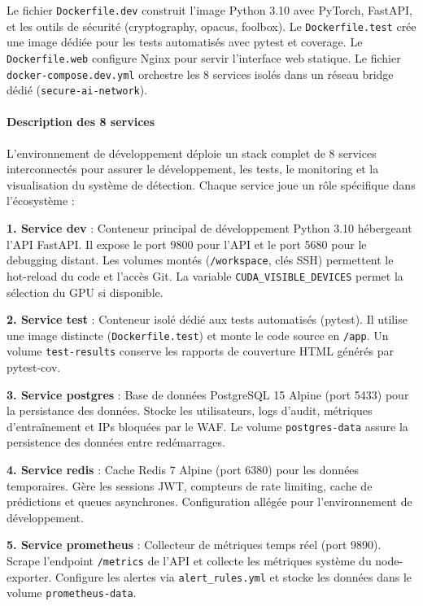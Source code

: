Le fichier \texttt{Dockerfile.dev} construit l'image Python 3.10 avec PyTorch, FastAPI, et les outils de sécurité (cryptography, opacus, foolbox). Le \texttt{Dockerfile.test} crée une image dédiée pour les tests automatisés avec pytest et coverage. Le \texttt{Dockerfile.web} configure Nginx pour servir l'interface web statique. Le fichier \texttt{docker-compose.dev.yml} orchestre les 8 services isolés dans un réseau bridge dédié (\texttt{secure-ai-network}).

\paragraph{Description des 8 services}

L'environnement de développement déploie un stack complet de 8 services interconnectés pour assurer le développement, les tests, le monitoring et la visualisation du système de détection. Chaque service joue un rôle spécifique dans l'écosystème :

\textbf{1. Service dev} : Conteneur principal de développement Python 3.10 hébergeant l'API FastAPI. Il expose le port 9800 pour l'API et le port 5680 pour le debugging distant. Les volumes montés (\texttt{/workspace}, clés SSH) permettent le hot-reload du code et l'accès Git. La variable \texttt{CUDA\_VISIBLE\_DEVICES} permet la sélection du GPU si disponible.

\textbf{2. Service test} : Conteneur isolé dédié aux tests automatisés (pytest). Il utilise une image distincte (\texttt{Dockerfile.test}) et monte le code source en \texttt{/app}. Un volume \texttt{test-results} conserve les rapports de couverture HTML générés par pytest-cov.

\textbf{3. Service postgres} : Base de données PostgreSQL 15 Alpine (port 5433) pour la persistance des données. Stocke les utilisateurs, logs d'audit, métriques d'entraînement et IPs bloquées par le WAF. Le volume \texttt{postgres-data} assure la persistence des données entre redémarrages.

\textbf{4. Service redis} : Cache Redis 7 Alpine (port 6380) pour les données temporaires. Gère les sessions JWT, compteurs de rate limiting, cache de prédictions et queues asynchrones. Configuration allégée pour l'environnement de développement.

\textbf{5. Service prometheus} : Collecteur de métriques temps réel (port 9890). Scrape l'endpoint \texttt{/metrics} de l'API et collecte les métriques système du node-exporter. Configure les alertes via \texttt{alert\_rules.yml} et stocke les données dans le volume \texttt{prometheus-data}.

